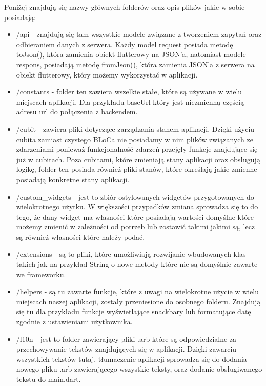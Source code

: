 \documentclass[a4paper,twoside,12pt]{book}
\begin{document}
Poniżej znajdują się nazwy głównych folderów oraz opis plików jakie w sobie posiadają:
\begin{itemize}
    \item /api - znajdują się tam wszystkie modele związane z tworzeniem zapytań oraz odbieraniem danych z serwera. Każdy model request posiada metodę toJson(), która zamienia obiekt flutterowy na JSON'a, natomiast modele respons, posiadają metodę fromJson(), która zamienia JSON'a z serwera na obiekt flutterowy, który możemy wykorzystać w aplikacji.

    \item /constants - folder ten zawiera wszelkie stałe, które są używane w wielu miejscach aplikacji. Dla przykładu baseUrl który jest niezmienną częścią adresu url do połączenia z backendem.

    \item /cubit - zawiera pliki dotyczące zarządzania stanem aplikacji. Dzięki użyciu cubita zamiast czystego BLoCa nie posiadamy w nim plików związanych ze zdarzeniami ponieważ funkcjonalność zdarzeń przejęły funkcje znajdujące się już w cubitach. Poza cubitami, które zmieniają stany aplikacji oraz obsługują logikę, folder ten posiada również pliki stanów, które określają jakie zmienne posiadają konkretne stany aplikacji.

    \item /custom\_widgets - jest to zbiór ostylowanych widgetów przygotowanych do wielokrotnego użytku. W większości przypadków zmiana sprowadza się to do tego, że dany widget ma własności które posiadają wartości domyślne które możemy zmienić w zależności od potrzeb lub zostawić takimi jakimi są, lecz są również własności które należy podać.

    \item /extensions - są to pliki, które umożliwiają rozwijanie wbudowanych klas takich jak na przykład String o nowe metody które nie są domyślnie zawarte we frameworku.

    \item /helpers - są tu zawarte funkcje, które z uwagi na wielokrotne użycie w wielu miejscach naszej aplikacji, zostały przeniesione do osobnego folderu. Znajdują się tu dla przykładu funkcje wyświetlające snackbary lub formatujące datę zgodnie z ustawieniami użytkownika. 

    \item /l10n - jest to folder zawierający pliki .arb które są odpowiedzialne za przechowywanie tekstów znajdujących się w aplikacji. Dzięki zawarciu wszystkich tekstów tutaj, tłumaczenie aplikacji sprowadza się do dodania nowego pliku .arb zawierającego wszystkie teksty, oraz dodanie obsługiwanego tekstu do main.dart. 


\end{itemize}
\end{document}
